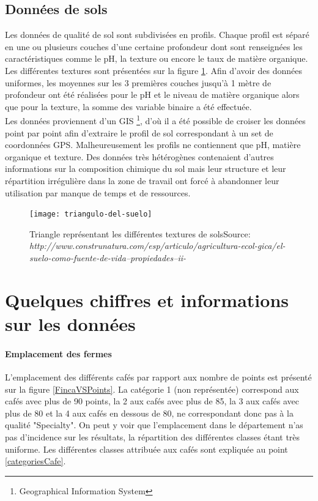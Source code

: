 \subsection{Données de sols} 
Les données de qualité de sol sont subdivisées en profils. Chaque profil est séparé en une ou plusieurs couches d’une certaine profondeur dont sont renseignées les caractéristiques comme le pH, la texture ou encore le taux de matière organique. Les différentes textures sont présentées sur la figure \ref{TriangleTexture}. Afin d'avoir des données uniformes, les moyennes sur les 3 premières couches jusqu'à 1 mètre de profondeur ont été réalisées pour le pH et le niveau de matière organique alors que pour la texture, la somme des variable binaire a été effectuée. \\


\noindent Les données proviennent d'un GIS \footnote{Geographical Information System}, d'où il a été possible de croiser les données point par point afin d'extraire le profil de sol correspondant à un set de coordonnées GPS. Malheureusement les profils ne contiennent que pH, matière organique et texture. Des données très hétérogènes contenaient d'autres informations sur la composition chimique du sol mais leur structure et leur répartition irrégulière dans la zone de travail ont forcé à abandonner leur utilisation par manque de temps et de ressources.

\begin{figure}[H]
	\centering
	\texttt{[image: triangulo-del-suelo]}
	\caption{\label{TriangleTexture} Triangle représentant les différentes textures de sols\newline Source: \textit{http://www.construnatura.com/esp/articulo/agricultura-ecol-gica/el-suelo-como-fuente-de-vida--propiedades--ii-}}
\end{figure}





\newpage
\section{Quelques chiffres et informations sur les données}

\paragraph{Emplacement des fermes}\label{EmpFermes} L'emplacement des différents cafés par rapport aux nombre de points est présenté sur la figure \ref{FincaVSPoints}. La catégorie 1 (non représentée) correspond aux cafés avec plus de 90 points, la 2 aux cafés avec plus de 85, la 3 aux cafés avec plus de 80 et la 4 aux cafés en dessous de 80, ne correspondant donc pas à la qualité "Specialty". On peut y voir que l'emplacement dans le département n'as pas d'incidence sur les résultats, la répartition des différentes classes étant très uniforme. Les différentes classes attribuée aux cafés sont expliquée au point \ref{categoriesCafe}.



